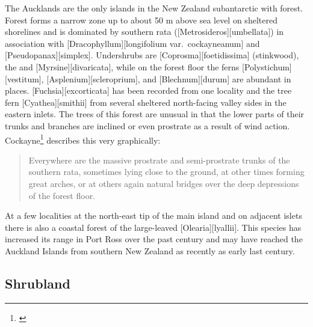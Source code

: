 The Aucklands are the only islands in the New Zealand subantarctic with forest.
Forest forms a narrow zone up to about 50 m above sea level on sheltered shorelines and is dominated by southern rata ([Metrosideros][umbellata]) in association with [Dracophyllum][longifolium var.\ cockayneanum] and [Pseudopanax][simplex].
Undershrubs are [Coprosma][foetidissima] (stinkwood), the  and [Myrsine][divaricata], while on the forest floor the ferns [Polystichum][vestitum], [Asplenium][scleroprium], and [Blechnum][durum] are abundant in places. [Fuchsia][excorticata] has been recorded from one locality and the tree fern [Cyathea][smithii] from several sheltered north-facing valley sides in the eastern inlets.
The trees of this forest are unusual in that the lower parts of their trunks and branches are inclined or even prostrate as a result of wind action.
Cockayne\footnote{\cite{cockayne1909ecological}} describes this very graphically:

\begin{quote}
	Everywhere are the massive prostrate and semi-prostrate trunks of the southern rata, sometimes lying close to the ground, at other times forming great arches, or at others again natural bridges over the deep depressions of the forest floor.
\end{quote}

At a few localities at the north-east tip of the main island and on adjacent islets there is also a coastal forest of the large-leaved [Olearia][lyallii].
This species has increased its range in Port Ross over the past century and may have reached the Auckland Islands from southern New Zealand as recently as early last century.

\subsection{Shrubland}

